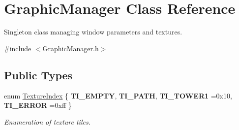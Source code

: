 \hypertarget{class_graphic_manager}{}\section{Graphic\+Manager Class Reference}
\label{class_graphic_manager}


Singleton class managing window parameters and textures.  




{\ttfamily \#include $<$Graphic\+Manager.\+h$>$}

\subsection*{Public Types}
\begin{DoxyCompactItemize}
\item 
\mbox{\label{class_graphic_manager_a8c72b253489f6f51d548812d566ed56e}} 
enum \mbox{\hyperlink{class_graphic_manager_a8c72b253489f6f51d548812d566ed56e}{Texture\+Index}} \{ {\bfseries T\+I\+\_\+\+E\+M\+P\+TY}, 
{\bfseries T\+I\+\_\+\+P\+A\+TH}, 
{\bfseries T\+I\+\_\+\+T\+O\+W\+E\+R1} =0x10, 
{\bfseries T\+I\+\_\+\+E\+R\+R\+OR} =0xff
 \}
\begin{DoxyCompactList}\small\item\em Enumeration of texture tiles. \end{DoxyCompactList}\end{DoxyCompactItemize}

